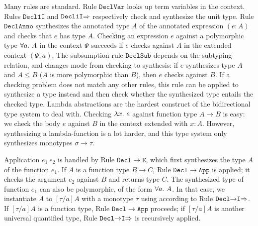 Many rules are standard.
Rule $\mathtt{DeclVar}$ looks up term variables in the context.
Rules $\mathtt{Decl1I}$ and $\mathtt{Decl1I{\Rightarrow}}$ respectively check and synthesize the unit type.
Rule $\mathtt{DeclAnno}$ synthesizes the annotated type $A$ of the annotated expression $(e:A)$
and checks that $e$ has type $A$.
Checking an expression $e$ against a polymorphic type $\all A$ in the context $\Psi$ succeeds
if $e$ checks against $A$ in the extended context $(\Psi, a)$.
The subsumption rule $\mathtt{DeclSub}$ depends on the subtyping relation,
and changes mode from checking to synthesis: if $e$ synthesizes type $A$ and $A\le B$
($A$ is more polymorphic than $B$), then $e$ checks against $B$.
If a checking problem does not match any other rules,
this rule can be applied to synthesize a type instead and then
check whether the synthesized type entails the checked type.
Lambda abstractions are the hardest construct of the bidirectional
type system to deal with. 
Checking $\lam e$ against function type $A\to B$ is easy:
we check the body $e$ against $B$ in the context extended with $x:A$.
However, synthesizing a lambda-function is a lot harder, and 
this type system only synthesizes monotypes $\sigma\to\tau$.

Application $e_1~e_2$ is handled by Rule $\mathtt{Decl{\to}E}$,
which first synthesizes the type $A$ of the function $e_1$.
If $A$ is a function type $B\to C$, Rule $\mathtt{Decl{\to}App}$ is applied;
it checks the argument $e_2$ against $B$ and returns type $C$.
The synthesized type of function $e_1$ can also be polymorphic, of the form $\all A$.
In that case, we instantiate $A$ to $[\tau/a]A$ with a monotype $\tau$ %
using according to Rule $\mathtt{Decl{\to}I{\Rightarrow}}$.
If $[\tau/a]A$ is a function type, Rule $\mathtt{Decl{\to}App}$ proceeds;
if $[\tau/a]A$ is another universal quantified type,
Rule $\mathtt{Decl{\to}I{\Rightarrow}}$ is recursively applied.

